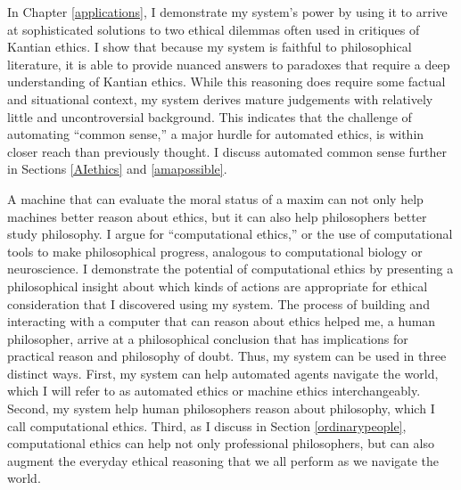 \begin{isabellebody}
\begin{isamarkuptext}
In Chapter \ref{applications}, I demonstrate my system's power by using it to arrive at sophisticated
solutions to two ethical dilemmas often used in critiques of Kantian ethics. I show that because my system is 
faithful to philosophical literature, it is able to provide nuanced answers to paradoxes that require a
deep understanding of Kantian ethics. While this reasoning does require some factual and situational
context, my system derives mature judgements with relatively little and uncontroversial background.
This indicates that the challenge of automating ``common sense,'' a major hurdle for automated ethics, 
is within closer reach than previously thought. I discuss automated common sense further in
Sections \ref{AIethics} and \ref{amapossible}.

A machine that can evaluate the moral status of a maxim can not only help machines better reason about ethics, 
but it can also help philosophers better study philosophy. I argue for ``computational ethics,'' or the use of computational tools to 
make philosophical progress, analogous to computational biology or neuroscience. 
I demonstrate the potential of computational ethics by presenting a 
philosophical insight about which kinds of actions are appropriate for ethical consideration that I 
discovered using my system. The process of building and interacting with a computer that can reason 
about ethics helped me, a human philosopher, arrive at a philosophical conclusion that has implications for practical
reason and philosophy of doubt. Thus, my system can be used in three distinct ways. First, my system can help
automated agents navigate the world, which I will refer to as automated ethics or machine ethics interchangeably. Second, 
my system help human philosophers reason about philosophy, which I call computational ethics. Third, as 
I discuss in Section \ref{ordinarypeople}, computational ethics can help not only professional philosophers,
but can also augment the everyday ethical reasoning that we all perform as we navigate the world.%
\end{isamarkuptext}\isamarkuptrue%
%
\isadelimtheory
%
\endisadelimtheory
%
\isatagtheory
%
\endisatagtheory
{\isafoldtheory}%
%
\isadelimtheory
%
\endisadelimtheory
%
\end{isabellebody}%
\endinput
